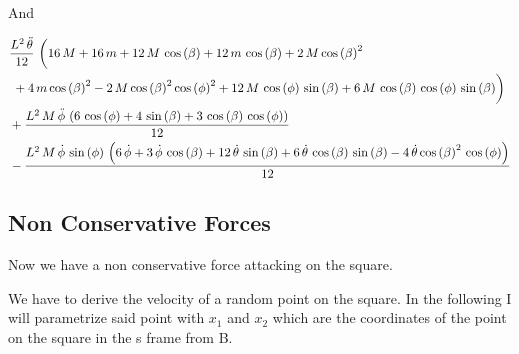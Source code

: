 And

\begin{equation}
    \begin{split}
        &\frac{L^2\,\mathrm{\ddot  \theta}}{12}\,\left(\vphantom{\int}16\,M+16\,m+12\,M\,\cos\left(\beta \right)+12\,m\,\cos\left(\beta \right)+2\,M\,{\cos\left(\beta \right)}^2\right.\\
        &\left.\vphantom{\int}+4\,m\,{\cos\left(\beta \right)}^2-2\,M\,{\cos\left(\beta \right)}^2\,{\cos\left(\phi \right)}^2+12\,M\,\cos\left(\phi \right)\,\sin\left(\beta \right)+6\,M\,\cos\left(\beta \right)\,\cos\left(\phi \right)\,\sin\left(\beta \right)\right)\\
        &+\frac{L^2\,M\,\mathrm{\ddot \phi}\,\left(6\,\cos\left(\phi \right)+4\,\sin\left(\beta \right)+3\,\cos\left(\beta \right)\,\cos\left(\phi \right)\right)}{12}\\
        &-\frac{L^2\,M\,\mathrm{\dot \phi}\,\sin\left(\phi \right)\,\left(6\,\mathrm{\dot \phi}+3\,\mathrm{\dot \phi}\,\cos\left(\beta \right)+12\,\mathrm{\dot  \theta}\,\sin\left(\beta \right)+6\,\mathrm{\dot  \theta}\,\cos\left(\beta \right)\,\sin\left(\beta \right)-4\,\mathrm{\dot  \theta}\,{\cos\left(\beta \right)}^2\,\cos\left(\phi \right)\right)}{12}
    \end{split}
\end{equation}



\subsection{Non Conservative Forces}\label{subsec:3.4}
Now we have a non conservative force attacking on the square.

We have to derive the velocity of a random point on the square. In the following I will parametrize said point with $x_1$ and $x_2$ which are the coordinates of the point on the square in the s frame from B.


